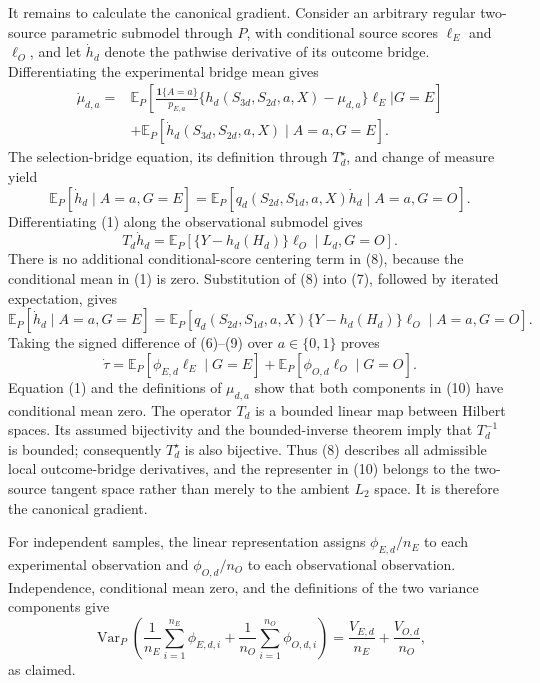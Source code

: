 It remains to calculate the canonical gradient.  Consider an arbitrary regular two-source parametric submodel through \(P\), with conditional source scores \(\ell_E\) and \(\ell_O\), and let \(\dot h_d\) denote the pathwise derivative of its outcome bridge.  Differentiating the experimental bridge mean gives
\[
\begin{aligned}
 \dot\mu_{d,a}
 ={}&\mathbb E_P\!\left[
   \frac{\mathbf 1\{A=a\}}{p_{E,a}}
   \{h_d(S_{3d},S_{2d},a,X)-\mu_{d,a}\}\ell_E
   \mathrel{\Big|}G=E\right]\\
 &+\mathbb E_P[\dot h_d(S_{3d},S_{2d},a,X)\mid A=a,G=E].
\end{aligned} \tag{6}
\]
The selection-bridge equation, its definition through \(T_d^\star\), and change of measure yield
\[
 \mathbb E_P[\dot h_d\mid A=a,G=E]
 =\mathbb E_P[q_d(S_{2d},S_{1d},a,X)\dot h_d\mid A=a,G=O]. \tag{7}
\]
Differentiating (1) along the observational submodel gives
\[
 T_d\dot h_d
 =\mathbb E_P[\{Y-h_d(H_d)\}\ell_O\mid L_d,G=O]. \tag{8}
\]
There is no additional conditional-score centering term in (8), because the conditional mean in (1) is zero.  Substitution of (8) into (7), followed by iterated expectation, gives
\[
 \mathbb E_P[\dot h_d\mid A=a,G=E]
 =\mathbb E_P[q_d(S_{2d},S_{1d},a,X)
 \{Y-h_d(H_d)\}\ell_O\mid A=a,G=O]. \tag{9}
\]
Taking the signed difference of (6)--(9) over \(a\in\{0,1\}\) proves
\[
 \dot\tau
 =\mathbb E_P[\phi_{E,d}\ell_E\mid G=E]
  +\mathbb E_P[\phi_{O,d}\ell_O\mid G=O]. \tag{10}
\]
Equation (1) and the definitions of \(\mu_{d,a}\) show that both components in (10) have conditional mean zero.  The operator \(T_d\) is a bounded linear map between Hilbert spaces.  Its assumed bijectivity and the bounded-inverse theorem imply that \(T_d^{-1}\) is bounded; consequently \(T_d^\star\) is also bijective.  Thus (8) describes all admissible local outcome-bridge derivatives, and the representer in (10) belongs to the two-source tangent space rather than merely to the ambient \(L_2\) space.  It is therefore the canonical gradient.

For independent samples, the linear representation assigns \(\phi_{E,d}/n_E\) to each experimental observation and \(\phi_{O,d}/n_O\) to each observational observation.  Independence, conditional mean zero, and the definitions of the two variance components give
\[
 \operatorname{Var}_P\!\left(
  \frac1{n_E}\sum_{i=1}^{n_E}\phi_{E,d,i}
 +\frac1{n_O}\sum_{i=1}^{n_O}\phi_{O,d,i}\right)
 =\frac{V_{E,d}}{n_E}+\frac{V_{O,d}}{n_O},
\]
as claimed.